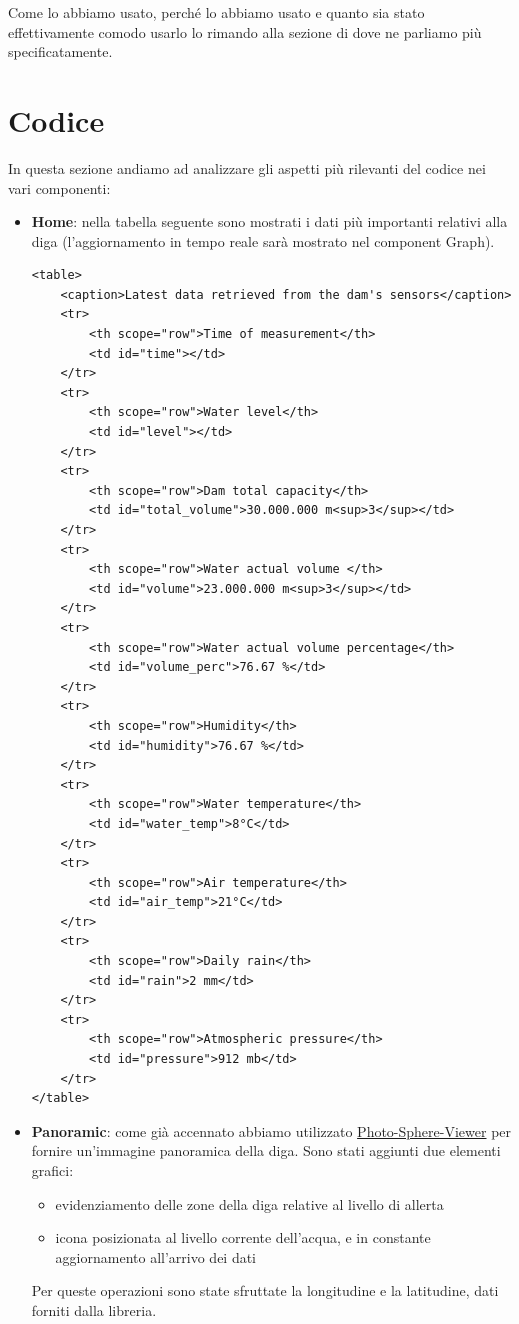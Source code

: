 \documentclass[a4paper,12pt]{report}
\newcommand{\photosphereviewer}{\href{https://photo-sphere-viewer.js.org/}{Photo-Sphere-Viewer} }
\begin{document}
Come lo abbiamo usato, perché lo abbiamo usato e quanto sia stato effettivamente comodo usarlo lo rimando alla sezione di  dove ne parliamo più specificatamente.

\clearpage
\chapter{Codice}\label{sec:code}
In questa sezione andiamo ad analizzare gli aspetti più rilevanti del codice nei vari componenti:
\begin{itemize}
    \item \textbf{Home}: nella tabella seguente sono mostrati i dati più importanti relativi alla diga (l'aggiornamento in tempo reale sarà mostrato nel component Graph).
    \begin{verbatim}
<table>
    <caption>Latest data retrieved from the dam's sensors</caption>
    <tr>
        <th scope="row">Time of measurement</th>
        <td id="time"></td>
    </tr>
    <tr>
        <th scope="row">Water level</th>
        <td id="level"></td>
    </tr>
    <tr>
        <th scope="row">Dam total capacity</th>
        <td id="total_volume">30.000.000 m<sup>3</sup></td>
    </tr>
    <tr>
        <th scope="row">Water actual volume </th>
        <td id="volume">23.000.000 m<sup>3</sup></td>
    </tr>
    <tr>
        <th scope="row">Water actual volume percentage</th>
        <td id="volume_perc">76.67 %</td>
    </tr>
    <tr>
        <th scope="row">Humidity</th>
        <td id="humidity">76.67 %</td>
    </tr>
    <tr>
        <th scope="row">Water temperature</th>
        <td id="water_temp">8°C</td>
    </tr>
    <tr>
        <th scope="row">Air temperature</th>
        <td id="air_temp">21°C</td>
    </tr>
    <tr>
        <th scope="row">Daily rain</th>
        <td id="rain">2 mm</td>
    </tr>
    <tr>
        <th scope="row">Atmospheric pressure</th>
        <td id="pressure">912 mb</td>
    </tr>
</table>
    \end{verbatim}
    
    \item \textbf{Panoramic}: come già accennato abbiamo utilizzato \photosphereviewer per fornire un'immagine panoramica della diga. Sono stati aggiunti due elementi grafici:
        \begin{itemize}
            \item evidenziamento delle zone della diga relative al livello di allerta
            \item icona posizionata al livello corrente dell'acqua, e in constante aggiornamento all'arrivo dei dati
        \end{itemize}
    Per queste operazioni sono state sfruttate la longitudine e la latitudine, dati forniti dalla libreria.
    

\end{itemize}
\end{document}
